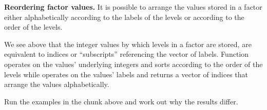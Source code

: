 \documentclass[krantz2]{krantz}\usepackage{knitr}
\begin{document}
\begin{advplayground}\label{calc:ADVPG:order:sort}
\textbf{Reordering factor values.} It is possible to arrange the values stored in a factor either alphabetically according to the labels of the levels or according to the order of the levels.

\begin{knitrout}\footnotesize
{}\color{fgcolor}\begin{kframe}
\begin{alltt}
 \hlkwb{<-} \hlstd{(}\hlstd{,} \hlstd{,}  \hlstd{=} \hlstd{(}\hlstd{,} \hlstd{,} \hlstd{,} \hlstd{))}
 \hlkwb{<-} \hlstd{(}\hlstd{(}\hlstd{(}\hlstd{,} \hlstd{,} \hlstd{,} \hlstd{),} \hlstd{(}\hlstd{,}\hlstd{)))}
\hlstd{(my.factor5)[}\hlstd{(my.factor5)]}
\end{alltt}
\end{kframe}
\end{knitrout}

We see above that the integer values by which levels in a factor are stored, are equivalent to indices or ``subscripts'' referencing the vector of labels. Function  operates on the values' underlying integers and sorts according to the order of the levels while  operates on the values' labels and returns a vector of indices that arrange the values alphabetically.

\begin{knitrout}\footnotesize
{}\color{fgcolor}\begin{kframe}
\begin{alltt}
\hlstd{my.factor4[}\hlstd{(my.factor4)]}
\hlstd{my.factor4[}\hlstd{(}\hlstd{(my.factor4))]}
\end{alltt}
\end{kframe}
\end{knitrout}

Run the examples in the chunk above and work out why the results differ.
\end{advplayground}
\end{document}
